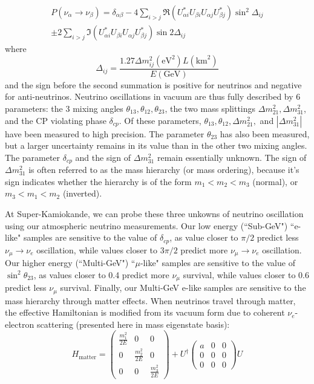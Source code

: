 \documentclass[12pt,oneside,openright]{article}
\begin{document}
\begin{multline}
P(\nu_{\alpha} \rightarrow \nu_{\beta})= \delta_{\alpha\beta}-4\sum_{i>j} \Re(U_{\alpha i}^*U_{\beta i}U_{\alpha j}U_{\beta j}^*)\sin^2 \Delta_{ij} \\ \pm 2\sum_{i>j} \Im(U_{\alpha i}^*U_{\beta i}U_{\alpha j}U_{\beta j}^*)\sin 2\Delta_{ij}
\label{eqn:oscprob}
\end{multline}
where $$ \Delta_{ij}=\frac{1.27 \Delta m_{ij}^2 (\textrm{eV}^2) L(\textrm{km}^2)}{E (\textrm{GeV})} $$ and the sign before the second summation is positive for neutrinos and negative for anti-neutrinos.
Neutrino oscillations in vacuum are thus fully described by 6 parameters: the 3 mixing angles $\theta_{13}, \theta_{12}, \theta_{23}$, the two mass splittings $\Delta m_{21}^2, \Delta m_{31}^2$, and the CP violating phase $\delta_{cp}$.  Of these parameters, $\theta_{13}, \theta_{12}, \Delta m_{21}^2,$ and $|\Delta m_{31}^2|$ have been measured to high precision.  The parameter $\theta_{23}$ has also been measured, but a larger uncertainty remains in its value than in the other two mixing angles.  The parameter $\delta_{cp}$ and the sign of $\Delta m_{31}^2$ remain essentially unknown.  The sign of $\Delta m_{31}^2$ is often referred to as the mass hierarchy (or mass ordering), because it's sign indicates whether the hierarchy is of the form $m_1<m_2<m_3$ (normal), or $m_3<m_1<m_2$ (inverted).\par
At Super-Kamiokande, we can probe these three unkowns of neutrino oscillation using our atmospheric neutrino measurements.   Our low energy (``Sub-GeV") ``e-like" samples are sensitive to the value of $\delta_{cp}$, as value closer to $\pi/2$ predict less $\nu_\mu \rightarrow \nu_e$ oscillation, while values closer to $3\pi/2$ predict more $\nu_\mu \rightarrow \nu_e$ oscillation.  Our higher energy (``Multi-GeV") ``$\mu$-like" samples are sensitive to the value of $\sin^2 \theta_{23}$, as values closer to 0.4 predict more $\nu_\mu$ survival, while values closer to 0.6 predict less $\nu_\mu$ survival.  Finally, our Multi-GeV e-like samples are sensitive to the mass hierarchy through matter effects.  When neutrinos travel through matter, the effective Hamiltonian is modified from its vacuum form due to coherent $\nu_e$-electron scattering (presented here in mass eigenstate basis):
\begin{equation}
H_{\textrm{matter}}=\begin{pmatrix}\frac{m_1^2}{2E}&0&0\\0&\frac{m_2^2}{2E}&0\\0&0&\frac{m_3^2}{2E} \end{pmatrix}  + U^\dagger\begin{pmatrix}a&0&0\\0&0&0\\0&0&0\end{pmatrix}U
\label{eqn:hamiltonian_matter}
\end{equation}
\end{document}
